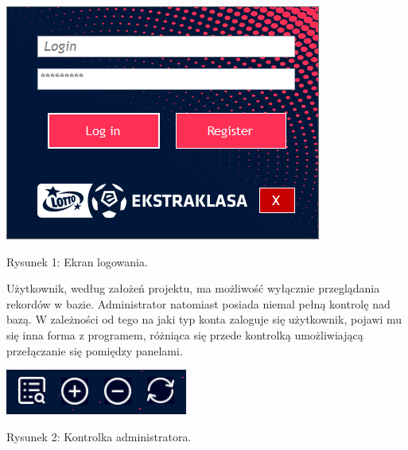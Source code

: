 \documentclass[12pt,a4paper]{article}
\begin{document}
    \begin{center}
        \includegraphics[scale=1]{login-panel.png}
        \begin{flushleft}
            \begin{scriptsize}
            \begin{list}{}{\leftmargin=21.5em}\raggedright\item\relax
            Rysunek 1: Ekran logowania.
            \end{list}
            \end{scriptsize}
        \end{flushleft}
    \end{center}
    
    Użytkownik, według założeń projektu, ma możliwość wyłącznie przeglądania rekordów w bazie. Administrator natomiast posiada niemal pełną kontrolę nad bazą. W zależności od tego na jaki typ konta zaloguje się użytkownik, pojawi mu się inna forma z programem, różniąca się przede kontrolką umożliwiającą przełączanie się pomiędzy panelami.
    
    \begin{center}
        \includegraphics[scale=1]{admin-controls.png}
        \begin{flushleft}
            \begin{scriptsize}
            \begin{list}{}{\leftmargin=19em}\raggedright\item\relax
            Rysunek 2: Kontrolka administratora.
            \end{list}
            \end{scriptsize}
        \end{flushleft}
    \end{center}
    
\end{document}
